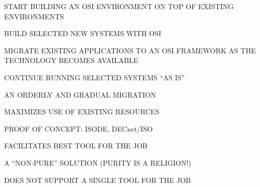 \begin{bwslide}

\begin{nrtc}
\item	START BUILDING AN OSI ENVIRONMENT ON TOP OF EXISTING ENVIRONMENTS

\item	BUILD SELECTED NEW SYSTEMS WITH OSI

\item	MIGRATE EXISTING APPLICATIONS TO AN OSI FRAMEWORK AS THE TECHNOLOGY
	BECOMES AVAILABLE

\item	CONTINUE RUNNING SELECTED SYSTEMS ``AS IS''
\end{nrtc}
\end{bwslide}


\begin{bwslide}
\end{bwslide}


\begin{bwslide}

\vskip-0.1in
\end{bwslide}


\begin{bwslide}

\begin{nrtc}
\item	AN ORDERLY AND GRADUAL MIGRATION

\item	MAXIMIZES USE OF EXISTING RESOURCES

\item	PROOF OF CONCEPT: ISODE, DECnet/ISO

\item	FACILITATES BEST TOOL FOR THE JOB
\end{nrtc}
\end{bwslide}


\begin{bwslide}

\begin{nrtc}
\item	 A ``NON-PURE'' SOLUTION (PURITY IS A RELIGION!)

\item	DOES NOT SUPPORT A SINGLE TOOL FOR THE JOB
\end{nrtc}
\end{bwslide}


